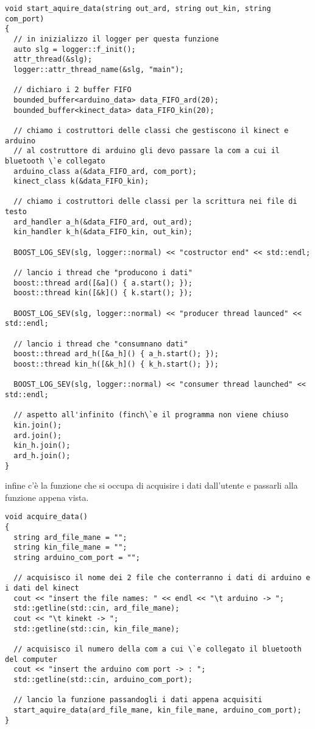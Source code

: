 \documentclass[10pt,a4paper]{article}
\begin{document}
\begin{lstlisting}[style=mycpp, caption=librerie usate, captionpos=b]
void start_aquire_data(string out_ard, string out_kin, string com_port)
{
  // in inizializzo il logger per questa funzione
  auto slg = logger::f_init();
  attr_thread(&slg);
  logger::attr_thread_name(&slg, "main");

  // dichiaro i 2 buffer FIFO
  bounded_buffer<arduino_data> data_FIFO_ard(20);
  bounded_buffer<kinect_data> data_FIFO_kin(20);

  // chiamo i costruttori delle classi che gestiscono il kinect e arduino
  // al costruttore di arduino gli devo passare la com a cui il bluetooth \`e collegato
  arduino_class a(&data_FIFO_ard, com_port);
  kinect_class k(&data_FIFO_kin);

  // chiamo i costruttori delle classi per la scrittura nei file di testo
  ard_handler a_h(&data_FIFO_ard, out_ard);
  kin_handler k_h(&data_FIFO_kin, out_kin);

  BOOST_LOG_SEV(slg, logger::normal) << "costructor end" << std::endl;

  // lancio i thread che "producono i dati"
  boost::thread ard([&a]() { a.start(); });
  boost::thread kin([&k]() { k.start(); });

  BOOST_LOG_SEV(slg, logger::normal) << "producer thread launced" << std::endl;

  // lancio i thread che "consumnano dati"
  boost::thread ard_h([&a_h]() { a_h.start(); });
  boost::thread kin_h([&k_h]() { k_h.start(); });

  BOOST_LOG_SEV(slg, logger::normal) << "consumer thread launched" << std::endl;

  // aspetto all'infinito (finch\`e il programma non viene chiuso
  kin.join();
  ard.join();
  kin_h.join();
  ard_h.join();
}
\end{lstlisting}
%
%
infine c'\`e la funzione che si occupa di acquisire i dati dall'utente e passarli alla funzione appena vista.
\begin{lstlisting}[style=mycpp, caption=librerie usate, captionpos=b]
void acquire_data()
{
  string ard_file_mane = "";
  string kin_file_mane = "";
  string arduino_com_port = "";

  // acquisisco il nome dei 2 file che conterranno i dati di arduino e i dati del kinect
  cout << "insert the file names: " << endl << "\t arduino -> ";
  std::getline(std::cin, ard_file_mane);
  cout << "\t kinekt -> ";
  std::getline(std::cin, kin_file_mane);

  // acquisisco il numero della com a cui \`e collegato il bluetooth del computer 
  cout << "insert the arduino com port -> : ";
  std::getline(std::cin, arduino_com_port);

  // lancio la funzione passandogli i dati appena acquisiti
  start_aquire_data(ard_file_mane, kin_file_mane, arduino_com_port);
}
\end{lstlisting}
\end{document}
